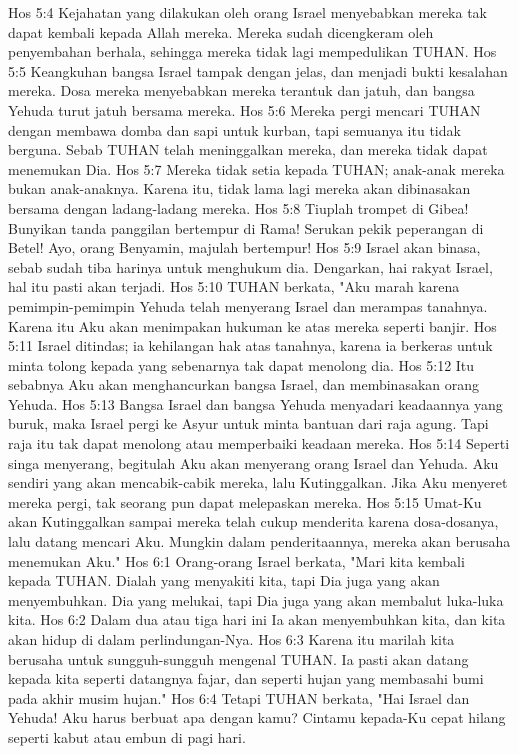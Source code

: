 Hos 5:4  Kejahatan yang dilakukan oleh orang Israel menyebabkan mereka tak dapat kembali kepada Allah mereka. Mereka sudah dicengkeram oleh penyembahan berhala, sehingga mereka tidak lagi mempedulikan TUHAN.
Hos 5:5  Keangkuhan bangsa Israel tampak dengan jelas, dan menjadi bukti kesalahan mereka. Dosa mereka menyebabkan mereka terantuk dan jatuh, dan bangsa Yehuda turut jatuh bersama mereka.
Hos 5:6  Mereka pergi mencari TUHAN dengan membawa domba dan sapi untuk kurban, tapi semuanya itu tidak berguna. Sebab TUHAN telah meninggalkan mereka, dan mereka tidak dapat menemukan Dia.
Hos 5:7  Mereka tidak setia kepada TUHAN; anak-anak mereka bukan anak-anaknya. Karena itu, tidak lama lagi mereka akan dibinasakan bersama dengan ladang-ladang mereka.
Hos 5:8  Tiuplah trompet di Gibea! Bunyikan tanda panggilan bertempur di Rama! Serukan pekik peperangan di Betel! Ayo, orang Benyamin, majulah bertempur!
Hos 5:9  Israel akan binasa, sebab sudah tiba harinya untuk menghukum dia. Dengarkan, hai rakyat Israel, hal itu pasti akan terjadi.
Hos 5:10  TUHAN berkata, "Aku marah karena pemimpin-pemimpin Yehuda telah menyerang Israel dan merampas tanahnya. Karena itu Aku akan menimpakan hukuman ke atas mereka seperti banjir.
Hos 5:11  Israel ditindas; ia kehilangan hak atas tanahnya, karena ia berkeras untuk minta tolong kepada yang sebenarnya tak dapat menolong dia.
Hos 5:12  Itu sebabnya Aku akan menghancurkan bangsa Israel, dan membinasakan orang Yehuda.
Hos 5:13  Bangsa Israel dan bangsa Yehuda menyadari keadaannya yang buruk, maka Israel pergi ke Asyur untuk minta bantuan dari raja agung. Tapi raja itu tak dapat menolong atau memperbaiki keadaan mereka.
Hos 5:14  Seperti singa menyerang, begitulah Aku akan menyerang orang Israel dan Yehuda. Aku sendiri yang akan mencabik-cabik mereka, lalu Kutinggalkan. Jika Aku menyeret mereka pergi, tak seorang pun dapat melepaskan mereka.
Hos 5:15  Umat-Ku akan Kutinggalkan sampai mereka telah cukup menderita karena dosa-dosanya, lalu datang mencari Aku. Mungkin dalam penderitaannya, mereka akan berusaha menemukan Aku."
Hos 6:1  Orang-orang Israel berkata, "Mari kita kembali kepada TUHAN. Dialah yang menyakiti kita, tapi Dia juga yang akan menyembuhkan. Dia yang melukai, tapi Dia juga yang akan membalut luka-luka kita.
Hos 6:2  Dalam dua atau tiga hari ini Ia akan menyembuhkan kita, dan kita akan hidup di dalam perlindungan-Nya.
Hos 6:3  Karena itu marilah kita berusaha untuk sungguh-sungguh mengenal TUHAN. Ia pasti akan datang kepada kita seperti datangnya fajar, dan seperti hujan yang membasahi bumi pada akhir musim hujan."
Hos 6:4  Tetapi TUHAN berkata, "Hai Israel dan Yehuda! Aku harus berbuat apa dengan kamu? Cintamu kepada-Ku cepat hilang seperti kabut atau embun di pagi hari.
